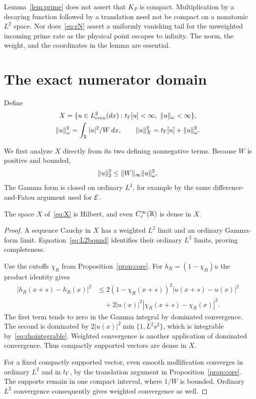 \begin{remark}
Lemma~\ref{lem:prime} does not assert that $K_P$ is compact. Multiplication by a decaying function followed by a translation need not be compact on a nonatomic $L^2$ space. Nor does~\eqref{eq:rN} assert a uniformly vanishing tail for the unweighted incoming prime rate as the physical point escapes to infinity. The norm, the weight, and the coordinates in the lemma are essential.
\end{remark}

\section{The exact numerator domain}\label{sec:domain}
Define
\begin{equation}\label{eq:X}
 \begin{gathered}
 X=\{u\in L^2_{\mathrm{even}}(dx):t_\Gamma[u]<\infty,\ \lVert u\rVert_\omega<\infty\},\\
 \lVert u\rVert_\omega^2=\int_\mathbb R |u|^2/W\,dx,\qquad
 \lVert u\rVert_X^2=t_\Gamma[u]+\lVert u\rVert_\omega^2.
 \end{gathered}
\end{equation}

We first analyze $X$ directly from its two defining nonnegative terms. Because $W$ is positive and bounded,
\begin{equation}\label{eq:L2bound}
 \lVert u\rVert_2^2\le\lVert W\rVert_\infty\lVert u\rVert_\omega^2.
\end{equation}
The Gamma form is closed on ordinary $L^2$, for example by the same difference-and-Fatou argument used for $\mathcal E$.

\begin{lemma}\label{lem:Xcore}
The space $X$ of~\eqref{eq:X} is Hilbert, and even $C_c^\infty(\mathbb R)$ is dense in $X$.
\end{lemma}
\begin{proof}
A sequence Cauchy in $X$ has a weighted $L^2$ limit and an ordinary Gamma-form limit. Equation~\eqref{eq:L2bound} identifies their ordinary $L^2$ limits, proving completeness.

Use the cutoffs $\chi_R$ from Proposition~\ref{prop:core}. For $h_R=(1-\chi_R)u$ the product identity gives
\begin{align*}
 |h_R(x+s)-h_R(x)|^2
 &\le2(1-\chi_R(x+s))^2|u(x+s)-u(x)|^2\\
 &\quad+2|u(x)|^2|\chi_R(x+s)-\chi_R(x)|^2.
\end{align*}
The first term tends to zero in the Gamma integral by dominated convergence. The second is dominated by
$2|u(x)|^2\min\{1,L^2s^2\}$, which is integrable by~\eqref{eq:rhointegrable}. Weighted convergence is another application of dominated convergence. Thus compactly supported vectors are dense in $X$.

For a fixed compactly supported vector, even smooth mollification converges in ordinary $L^2$ and in $t_\Gamma$, by the translation argument in Proposition~\ref{prop:core}. The supports remain in one compact interval, where $1/W$ is bounded. Ordinary $L^2$ convergence consequently gives weighted convergence as well.
\end{proof}

